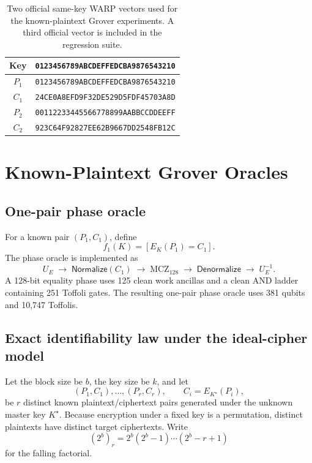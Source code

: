 \documentclass[10pt,a4paper]{article}
\begin{document}
\begin{table}[t]
\centering
\caption{Two official same-key WARP vectors used for the known-plaintext Grover experiments. A third official vector is included in the regression suite.}
\label{tab:vectors}
\small
\begin{tabular}{c@{\;}l}
\toprule
Key & \texttt{0123456789ABCDEFFEDCBA9876543210}\\
\midrule
$P_1$ & \texttt{0123456789ABCDEFFEDCBA9876543210}\\
$C_1$ & \texttt{24CE0A8EFD9F32DE529D5FDF45703A8D}\\
\addlinespace
$P_2$ & \texttt{00112233445566778899AABBCCDDEEFF}\\
$C_2$ & \texttt{923C64F92827EE62B9667DD2548FB12C}\\
\bottomrule
\end{tabular}
\end{table}
\FloatBarrier

\section{Known-Plaintext Grover Oracles}

\subsection{One-pair phase oracle}
For a known pair $(P_1,C_1)$, define
\begin{equation}
    f_1(K)=[E_K(P_1)=C_1].
\end{equation}The phase oracle is implemented as
\begin{equation}
U_E\;\rightarrow\;\textsf{Normalize}(C_1)\;\rightarrow\;\mathrm{MCZ}_{128}\;\rightarrow\;\textsf{Denormalize}\;\rightarrow\;U_E^{-1}.
\end{equation}
A 128-bit equality phase uses 125 clean work ancillas and a clean AND ladder containing 251 Toffoli gates. The resulting one-pair phase oracle uses 381 qubits and 10,747 Toffolis.

\subsection{Exact identifiability law under the ideal-cipher model}
\label{subsec:identifiability}
Let the block size be $b$, the key size be $k$, and let
\[
(P_1,C_1),\ldots,(P_r,C_r),\qquad C_i=E_{K^\star}(P_i),
\]
be $r$ distinct known plaintext/ciphertext pairs generated under the unknown master key $K^\star$.  Because encryption under a fixed key is a permutation, distinct plaintexts have distinct target ciphertexts.  Write
\begin{equation}
    (2^b)_r=2^b(2^b-1)\cdots(2^b-r+1)
\end{equation}
for the falling factorial.
\end{document}
